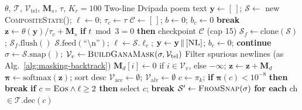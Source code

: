 \documentclass[11pt]{article}
\begin{document}
\begin{algorithm}[H]
\caption{Strategy~3: Hybrid (Mask + Accept-State Re-ranking)}
\label{alg:hybrid}
\scriptsize
\begin{algorithmic}[1]
\Require $\theta$, $\mathcal{T}$, $\mathcal{V}_{\text{tel}}$,
         $\mathbf{M}_s$, $\tau$, $K_r{=}100$
\Ensure Two-line Dvipada poem text
\State $\mathbf{y} \gets [\,]$;\;
       $\mathcal{S} \gets$ new \textsc{CompositeState}();\;
       $\ell \gets 0$;\; $\tau_c \gets \tau$
\State $\mathcal{C} \gets [\,]$;\;
       $b \gets 0$;\; $b_c \gets 0$
     \textbf{break} \EndIf
    \State $\mathbf{z} \gets \theta(\mathbf{y})/\tau_c
           + \mathbf{M}_s$
    \State \textbf{if} $t \bmod 3 = 0$
           \textbf{then} checkpoint
           $\mathcal{C}$ (cap 15)
    \State {}
    \State $\mathcal{S}_f \gets \text{clone}(\mathcal{S})$;\;
           $\mathcal{S}_f.\text{flush}()$
        \State $\mathcal{S}.\text{feed}(
               \text{``\textbackslash n''})$;\;
               $\ell \gets \mathcal{S}.\ell_c$;\;
               $\mathbf{y} \gets \mathbf{y} \,\|\,
               [\textsc{NL}]$;\;
               $b_c \gets 0$;\;
               \textbf{continue}
    \EndIf
    \State {}
    \State $\sigma \gets \mathcal{S}.\text{snap}()$;\;
           $\mathcal{V}_v \gets
           \textsc{BuildGanaMask}(\sigma,
           \mathcal{V}_{\text{tel}})$
    \State Filter spurious newlines
           (as Alg.~\ref{alg:masking-backtrack})
    \State $\mathbf{M}_d[i] \gets 0$ if
           $i \in \mathcal{V}_v$, else $-\infty$;\;
           $\mathbf{z} \gets \mathbf{z} + \mathbf{M}_d$
    \State $\boldsymbol{\pi} \gets
           \text{softmax}(\mathbf{z})$;\;
           sort desc
    \State {}
    \State $\mathcal{V}_{\text{acc}} \gets \emptyset$;\;
           $\mathcal{V}_{\text{alv}} \gets \emptyset$
        \State $c \gets \pi_k$;\;
               \textbf{if} $\boldsymbol{\pi}(c) < 10^{-8}$
               \textbf{then break}
        \State \textbf{if} $c = \textsc{Eos} \wedge
               \ell \ge 2$ \textbf{then} select $c$;
               \textbf{break}
        \State {}
        \State $\mathcal{S}' \gets
               \textsc{FromSnap}(\sigma)$
        \State \textbf{for each} ch $\in
               \mathcal{T}.\text{dec}(c)$

\end{algorithmic}
\end{algorithm}
\end{document}
